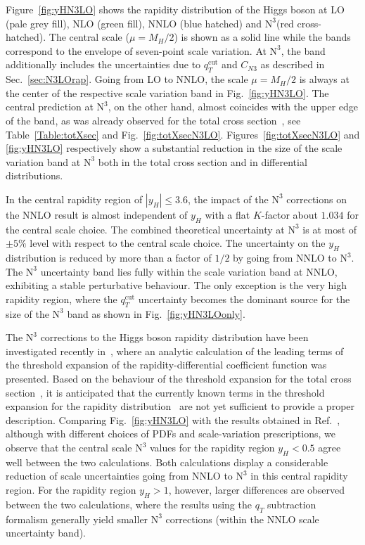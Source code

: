 \documentclass[12pt]{article}
\DeclareRobustCommand{\qt}{\ensuremath{q_T}\xspace}
\DeclareRobustCommand{\qtcut}{\ensuremath{q_T^\mathrm{cut}}\xspace}
\DeclareRobustCommand{\LO}{\text{LO}\xspace}
\DeclareRobustCommand{\N}[1]{\ensuremath{\text{N}^{#1}}} %
\begin{document}
Figure~\ref{fig:yHN3LO} shows the rapidity distribution of the Higgs boson at LO (pale grey fill), NLO (green fill), NNLO (blue hatched) and \N3\LO (red cross-hatched). 
The central scale ($\mu=M_{H}/2$) is shown as a solid line while the bands correspond to the envelope of seven-point scale variation. 
At \N3\LO, the band additionally includes the uncertainties due to $\qtcut$ and $C_{N3}$ as described in Sec.~\ref{sec:N3LOrap}.
Going from LO to NNLO, the scale $\mu=M_{H}/2$ is always at the center of the respective scale variation band in Fig.~\ref{fig:yHN3LO}.  The central prediction at \N3\LO, on the other hand, almost coincides with the upper edge of the band, as was already observed for the total cross section~\cite{Anastasiou:2015ema,Mistlberger:2018etf}, see Table~\ref{Table:totXsec} and Fig.~\ref{fig:totXsecN3LO}.
Figures~\ref{fig:totXsecN3LO} and \ref{fig:yHN3LO} respectively show a substantial reduction in the size of the scale variation band at \N3\LO both in the total cross section and in differential distributions.

In the central rapidity region of $|y_{H}| \leq 3.6$, the impact of the \N3\LO corrections on the NNLO result is almost independent of $y_{H}$ with a flat $K$-factor about $1.034$ for the central scale choice. The combined theoretical uncertainty at \N3\LO is at most of $\pm 5 \%$ level with respect to the central scale choice. The uncertainty on the $y_H$ distribution is reduced by more than a factor of $1/2$ by going from NNLO to \N3\LO. The \N3\LO uncertainty band lies fully within the scale variation band at NNLO, exhibiting a stable perturbative behaviour. 
The only exception is the very high rapidity region, where the $\qtcut$ uncertainty becomes the dominant source for the size of the \N3\LO band as shown in Fig.~\ref{fig:yHN3LOonly}.

The \N3\LO corrections to the Higgs boson rapidity distribution have been investigated recently in~\cite{Dulat:2017prg},
where an analytic calculation of the leading terms of the threshold expansion of the  rapidity-differential coefficient function 
was presented. Based on the behaviour of the threshold expansion for the total cross section~\cite{Anastasiou:2015ema}, 
it is anticipated that the currently known terms in the threshold expansion for the rapidity distribution~\cite{Dulat:2017prg} are not yet sufficient to provide a proper description.  
Comparing Fig.~\ref{fig:yHN3LO} with the results obtained in Ref.~\cite{Dulat:2017prg}, although with different choices of PDFs and scale-variation prescriptions, we observe that the central scale \N3\LO values for the rapidity region $y_H < 0.5$ agree well between the two calculations. Both calculations display a considerable reduction of scale uncertainties going from NNLO to \N3\LO in this central rapidity region. 
For the rapidity region $y_H > 1$, however, larger differences are observed between the two calculations, where the results using the $\qt$ subtraction formalism generally yield smaller \N3\LO corrections 
(within the NNLO scale uncertainty band).
\end{document}
